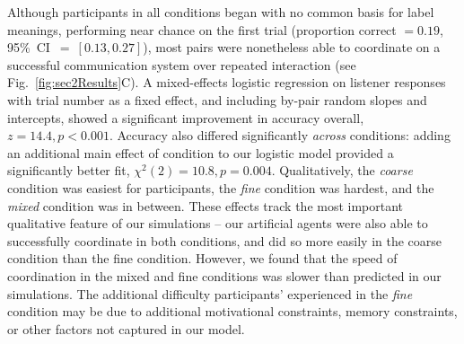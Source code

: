 Although participants in all conditions began with no common basis for label meanings, performing near chance on the first trial (proportion correct $= 0.19$, 95\%~CI~$=~[0.13, 0.27]$), most pairs were nonetheless able to coordinate on a successful communication system over repeated interaction (see Fig.\ \ref{fig:sec2Results}C). 
A mixed-effects logistic regression on listener responses with trial number as a fixed effect, and including by-pair random slopes and intercepts, showed a significant improvement in accuracy overall, $z = 14.4, p < 0.001$. 
Accuracy also differed significantly \emph{across} conditions: adding an additional main effect of condition to our logistic model provided a significantly better fit, $\chi^2(2) = 10.8, p = 0.004$. 
Qualitatively, the \emph{coarse} condition was easiest for participants, the \emph{fine} condition was hardest, and the \emph{mixed} condition was in between.
These effects track the most important qualitative feature of our simulations -- our artificial agents were also able to successfully coordinate in both conditions, and did so more easily in the coarse condition than the fine condition. 
However, we found that the speed of coordination in the mixed and fine conditions was slower than predicted in our simulations.
The additional difficulty participants' experienced in the \emph{fine} condition may be due to additional motivational constraints, memory constraints, or other factors not captured in our model.


%
%


